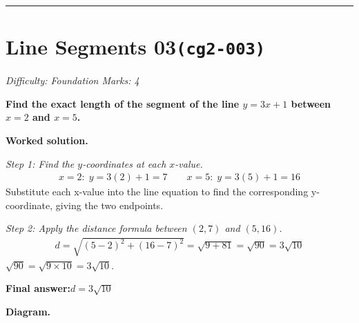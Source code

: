 \documentclass[11pt]{article}
\newcommand{\question}[1]{\par\medskip\noindent\textbf{#1}\par}
\begin{document}
\medskip\hrule

\section*{Line Segments 03\quad\small\texttt{(cg2-003)}}
\textit{Difficulty: Foundation \quad\textbar\quad Marks: 4}

\question{Find the exact length of the segment of the line \( y = 3x + 1 \) between \( x = 2 \) and \( x = 5 \).}

\textbf{Worked solution.}

\textit{Step 1: Find the \( y \)-coordinates at each \( x \)-value.}
\[\begin{gathered}
x = 2:\; y = 3(2) + 1 = 7 \qquad x = 5:\; y = 3(5) + 1 = 16
\end{gathered}\]
Substitute each x-value into the line equation to find the corresponding y-coordinate, giving the two endpoints.

\textit{Step 2: Apply the distance formula between \( (2, 7) \) and \( (5, 16) \).}
\[\begin{gathered}
d = \sqrt{(5 - 2)^2 + (16 - 7)^2} = \sqrt{9 + 81} = \sqrt{90} = 3\sqrt{10}
\end{gathered}\]
\(\sqrt{90} = \sqrt{9 \times 10} = 3\sqrt{10}\).

\begin{answerbox}
\textbf{Final answer:}\quad \(\displaystyle d = 3\sqrt{10}\)
\end{answerbox}
\textbf{Diagram.}
\end{document}
